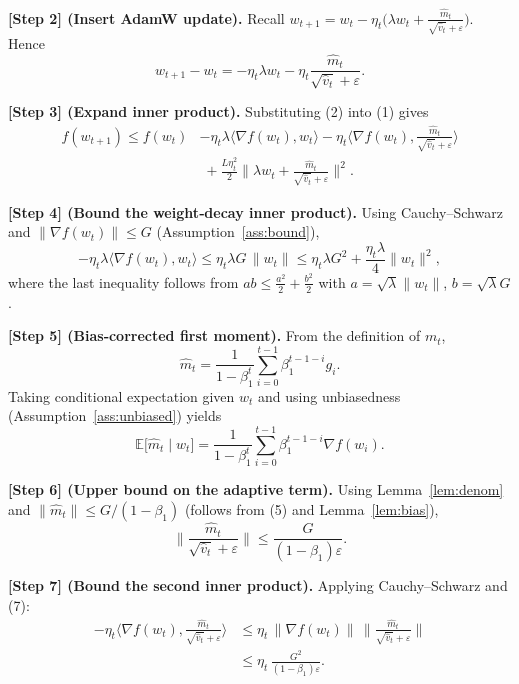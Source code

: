 \documentclass{article}
\newcommand{\E}{\mathbb{E}}
\begin{document}
\noindent\textbf{[Step 2] (Insert AdamW update).}
Recall $w_{t+1}=w_{t}-\eta_{t}\big(\lambda w_{t}+ \frac{\hat m_{t}}{\sqrt{\hat v_{t}}+\varepsilon}\big)$. Hence
\[
w_{t+1}-w_{t}= -\eta_{t}\lambda w_{t}
               -\eta_{t}\frac{\hat m_{t}}{\sqrt{\hat v_{t}}+\varepsilon}.
\tag{2}
\]

\noindent\textbf{[Step 3] (Expand inner product).}
Substituting (2) into (1) gives
\[
\begin{aligned}
f(w_{t+1})\le f(w_{t})
 &-\eta_{t}\lambda\langle\nabla f(w_{t}),w_{t}\rangle
 -\eta_{t}\Big\langle\nabla f(w_{t}),\frac{\hat m_{t}}{\sqrt{\hat v_{t}}+\varepsilon}\Big\rangle\\
 &\;+\frac{L\eta_{t}^{2}}{2}\Big\|
       \lambda w_{t}+ \frac{\hat m_{t}}{\sqrt{\hat v_{t}}+\varepsilon}
       \Big\|^{2}.
\end{aligned}
\tag{3}
\]

\noindent\textbf{[Step 4] (Bound the weight‑decay inner product).}
Using Cauchy–Schwarz and $ \| \nabla f(w_{t})\|\le G$ (Assumption~\ref{ass:bound}),
\[
-\eta_{t}\lambda\langle\nabla f(w_{t}),w_{t}\rangle
\le \eta_{t}\lambda G\,\|w_{t}\|
\le \eta_{t}\lambda G^{2}+\frac{\eta_{t}\lambda}{4}\|w_{t}\|^{2},
\tag{4}
\]
where the last inequality follows from $ab\le \frac{a^{2}}{2}+\frac{b^{2}}{2}$ with $a=\sqrt{\lambda}\|w_{t}\|$, $b=\sqrt{\lambda}G$.

\noindent\textbf{[Step 5] (Bias‑corrected first moment).}
From the definition of $m_{t}$,
\[
\hat m_{t}= \frac{1}{1-\beta_{1}^{t}}
            \sum_{i=0}^{t-1}\beta_{1}^{t-1-i}g_{i}.
\tag{5}
\]
Taking conditional expectation given $w_{t}$ and using unbiasedness (Assumption~\ref{ass:unbiased}) yields
\[
\E\!\big[\hat m_{t}\mid w_{t}\big]
   =\frac{1}{1-\beta_{1}^{t}}
     \sum_{i=0}^{t-1}\beta_{1}^{t-1-i}\nabla f(w_{i}).
\tag{6}
\]

\noindent\textbf{[Step 6] (Upper bound on the adaptive term).}
Using Lemma~\ref{lem:denom} and $\|\hat m_{t}\|\le G/(1-\beta_{1})$ (follows from (5) and Lemma~\ref{lem:bias}),
\[
\Big\|\frac{\hat m_{t}}{\sqrt{\hat v_{t}}+\varepsilon}\Big\|
   \le \frac{G}{(1-\beta_{1})\varepsilon}.
\tag{7}
\]

\noindent\textbf{[Step 7] (Bound the second inner product).}
Applying Cauchy–Schwarz and (7):
\[
\begin{aligned}
-\eta_{t}\Big\langle\nabla f(w_{t}),\frac{\hat m_{t}}{\sqrt{\hat v_{t}}+\varepsilon}\Big\rangle
   &\le \eta_{t}\,\|\nabla f(w_{t})\|\,
        \Big\|\frac{\hat m_{t}}{\sqrt{\hat v_{t}}+\varepsilon}\Big\|\\
   &\le \eta_{t}\,\frac{G^{2}}{(1-\beta_{1})\varepsilon}.
\end{aligned}
\tag{8}
\]
\end{document}
